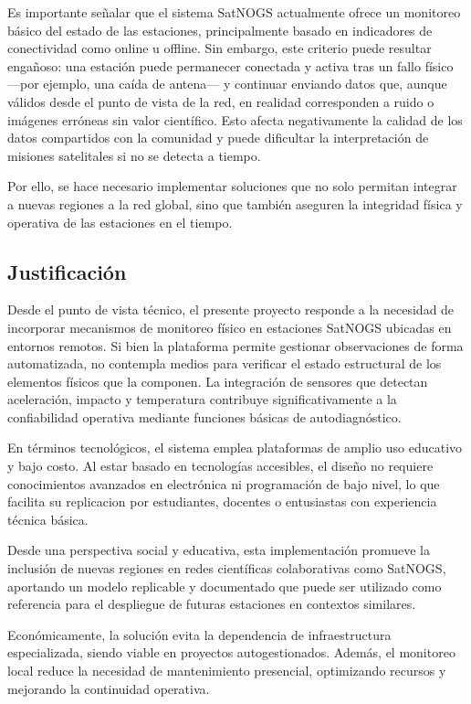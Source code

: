 \documentclass[conference]{IEEEtran}
\begin{document}
Es importante señalar que el sistema SatNOGS actualmente ofrece un monitoreo básico del estado de las estaciones, principalmente basado en indicadores de conectividad como online u offline. Sin embargo, este criterio puede resultar engañoso: una estación puede permanecer conectada y activa tras un fallo físico —por ejemplo, una caída de antena— y continuar enviando datos que, aunque válidos desde el punto de vista de la red, en realidad corresponden a ruido o imágenes erróneas sin valor científico. Esto afecta negativamente la calidad de los datos compartidos con la comunidad y puede dificultar la interpretación de misiones satelitales si no se detecta a tiempo.

Por ello, se hace necesario implementar soluciones que no solo permitan integrar a nuevas regiones a la red global, sino que también aseguren la integridad física y operativa de las estaciones en el tiempo.


\subsection{Justificación}

Desde el punto de vista técnico, el presente proyecto responde a la necesidad de incorporar mecanismos de monitoreo físico en estaciones SatNOGS ubicadas en entornos remotos. Si bien la plataforma permite gestionar observaciones de forma automatizada, no contempla medios para verificar el estado estructural de los elementos físicos que la componen. La integración de sensores que detectan aceleración, impacto y temperatura contribuye significativamente a la confiabilidad operativa mediante funciones básicas de autodiagnóstico.

En términos tecnológicos, el sistema emplea plataformas de amplio uso educativo y bajo costo. Al estar basado en tecnologías accesibles, el diseño no requiere conocimientos avanzados en electrónica ni programación de bajo nivel, lo que facilita su replicacion por estudiantes, docentes o entusiastas con experiencia técnica básica.

Desde una perspectiva social y educativa, esta implementación promueve la inclusión de nuevas regiones en redes científicas colaborativas como SatNOGS, aportando un modelo replicable y documentado que puede ser utilizado como referencia para el despliegue de futuras estaciones en contextos similares.

Económicamente, la solución evita la dependencia de infraestructura especializada, siendo viable en proyectos autogestionados. Además, el monitoreo local reduce la necesidad de mantenimiento presencial, optimizando recursos y mejorando la continuidad operativa.
\end{document}
